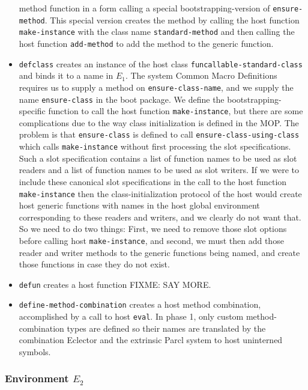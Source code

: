 \begin{itemize}
  method function in a form calling a special bootstrapping-version of
  \texttt{ensure-method}.  This special version creates the method by
  calling the host function \texttt{make-instance} with the class name
  \texttt{standard-method} and then calling the host function
  \texttt{add-method} to add the method to the generic function.
\item \texttt{defclass} creates an instance of the host class
  \texttt{funcallable-standard-class} and binds it to a name in $E_1$.
  The system Common Macro Definitions requires us to supply a method
  on \texttt{ensure-class-name}, and we supply the name
  \texttt{ensure-class} in the boot package.  We define the
  bootstrapping-specific function to call the host function
  \texttt{make-instance}, but there are some complications due to the
  way class initialization is defined in the MOP.  The problem is that
  \texttt{ensure-class} is defined to call
  \texttt{ensure-class-using-class} which calls \texttt{make-instance}
  without first processing the slot specifications.  Such a slot
  specification contains a list of function names to be used as slot
  readers and a list of function names to be used as slot writers.  If
  we were to include these canonical slot specifications in the call
  to the host function \texttt{make-instance} then the
  class-initialization protocol of the host would create host generic
  functions with names in the host global environment corresponding to
  these readers and writers, and we clearly do not want that.  So we
  need to do two things: First, we need to remove those slot options
  before calling host \texttt{make-instance}, and second, we must then
  add those reader and writer methods to the generic functions being
  named, and create those functions in case they do not exist.
\item \texttt{defun} creates a host function FIXME: SAY MORE.
\item \texttt{define-method-combination} creates a host method
  combination, accomplished by a call to host \texttt{eval}.  In phase
  1, only custom method-combination types are defined so their names
  are translated by the combination Eclector and the extrinsic Parcl
  system to host uninterned symbols.
\end{itemize}

\subsubsection{Environment $E_2$}

